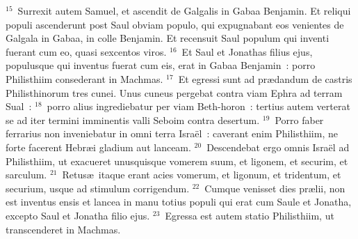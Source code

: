 ${}^{15}$~Surrexit autem Samuel, et ascendit de Galgalis in Gabaa Benjamin. Et reliqui populi ascenderunt post Saul obviam populo, qui expugnabant eos venientes de Galgala in Gabaa, in colle Benjamin. Et recensuit Saul populum qui inventi fuerant cum eo, quasi sexcentos viros.
${}^{16}$~Et Saul et Jonathas filius ejus, populusque qui inventus fuerat cum eis, erat in Gabaa Benjamin~: porro Philisthiim consederant in Machmas.
${}^{17}$~Et egressi sunt ad pr\ae dandum de castris Philisthinorum tres cunei. Unus cuneus pergebat contra viam Ephra ad terram Sual~:
${}^{18}$~porro alius ingrediebatur per viam Beth-horon~: tertius autem verterat se ad iter termini imminentis valli Seboim contra desertum.
${}^{19}$~Porro faber ferrarius non inveniebatur in omni terra Isra\"el~: caverant enim Philisthiim, ne forte facerent Hebr\ae i gladium aut lanceam.
${}^{20}$~Descendebat ergo omnis Isra\"el ad Philisthiim, ut exacueret unusquisque vomerem suum, et ligonem, et securim, et sarculum.
${}^{21}$~Retus\ae\ itaque erant acies vomerum, et ligonum, et tridentum, et securium, usque ad stimulum corrigendum.
${}^{22}$~Cumque venisset dies pr\ae lii, non est inventus ensis et lancea in manu totius populi qui erat cum Saule et Jonatha, excepto Saul et Jonatha filio ejus.
${}^{23}$~Egressa est autem statio Philisthiim, ut transcenderet in Machmas.

